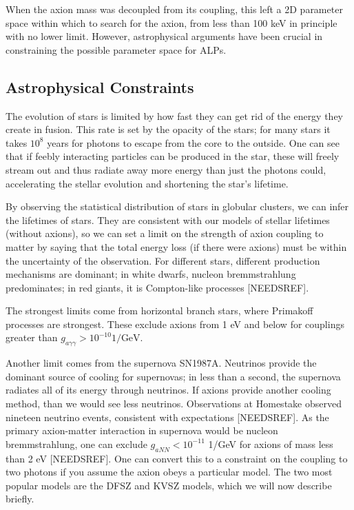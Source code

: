 \documentclass[11pt]{book}
\begin{document}
When the axion mass was decoupled from its coupling, this left a 2D parameter space within which to search for the axion, from less than 100 keV in principle with no lower limit. However, astrophysical arguments have been crucial in constraining the possible parameter space for ALPs.

\subsection{Astrophysical Constraints}

The evolution of stars is limited by how fast they can get rid of the energy they create in fusion. This rate is set by the opacity of the stars; for many stars it takes $10^8$ years for photons to escape from the core to the outside. One can see that if feebly interacting particles can be produced in the star, these will freely stream out and thus radiate away more energy than just the photons could, accelerating the stellar evolution and shortening the star's lifetime.

By observing the statistical distribution of stars in globular clusters, we can infer the lifetimes of stars. They are consistent with our models of stellar lifetimes (without axions), so we can set a limit on the strength of axion coupling to matter by saying that the total energy loss (if there were axions) must be within the uncertainty of the observation. For different stars, different production mechanisms are dominant; in white dwarfs, nucleon bremmstrahlung predominates; in red giants, it is Compton-like processes [NEEDSREF].

The strongest limits come from horizontal branch stars, where Primakoff processes are strongest. These exclude axions from 1 eV and below for couplings greater than $g_{a\gamma\gamma} > 10^{-10} \text{1}/\text{GeV}$.

Another limit comes from the supernova SN1987A. Neutrinos provide the dominant source of cooling for supernovas; in less than a second, the supernova radiates all of its energy through neutrinos. If axions provide another cooling method, than we would see less neutrinos. Observations at Homestake observed nineteen neutrino events, consistent with expectations [NEEDSREF]. As the primary axion-matter interaction in supernova would be nucleon bremmstrahlung, one can exclude $g_{aNN} < 10^{-11}$ 1/GeV for axions of mass less than 2 eV [NEEDSREF]. One can convert this to a constraint on the coupling to two photons if you assume the axion obeys a particular model. The two most popular models are the DFSZ and KVSZ models, which we will now describe briefly.
\end{document}
